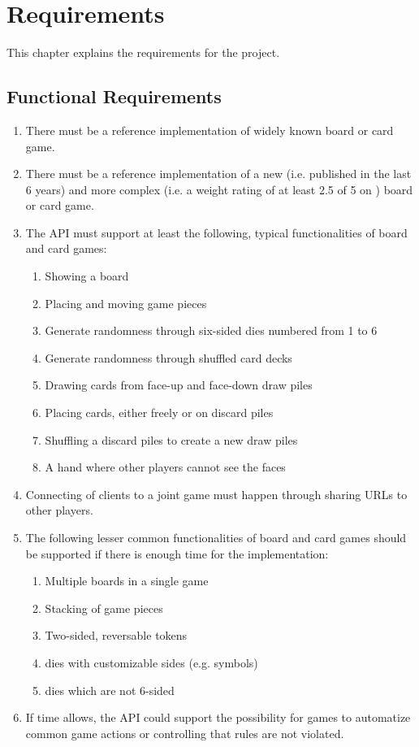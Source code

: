 \chapter{Requirements} \label{chap:requirements}

This chapter explains the requirements for the project.

\section{Functional Requirements}

\begin{enumerate}
  \item There must be a reference implementation of widely known board or card
  game.
  \item There must be a reference implementation of a new (i.e. published in
  the last 6 years) and more complex (i.e. a weight rating of at least 2.5 of 5
  on \cite{BGG}) board or card game.
  \item The API must support at least the following, typical functionalities of
  board and card games:
  \begin{enumerate}
    \item Showing a board
    \item Placing and moving game pieces
    \item Generate randomness through six-sided \glspl{die} numbered from 1 to 6
    \item Generate randomness through shuffled card \glspl{deck}
    \item Drawing cards from \gls{face}-up and \gls{face}-down
    \glspl{draw pile}
    \item Placing cards, either freely or on \glspl{discard pile}
    \item Shuffling a \glspl{discard pile} to create a new \glspl{draw pile}
    \item A \gls{hand} where other players cannot see the \glspl{face}
  \end{enumerate}
  \item Connecting of clients to a joint game must happen through sharing URLs
  to other players.
  \item The following lesser common functionalities of board and card games
  should be supported if there is enough time for the implementation:
  \begin{enumerate}
    \item Multiple boards in a single game
    \item Stacking of game pieces
    \item Two-sided, reversable tokens
    \item \Glspl{die} with customizable sides (e.g. symbols)
    \item \Glspl{die} which are not 6-sided
  \end{enumerate}
  \item If time allows, the API could support the possibility for games to
  automatize common game actions or controlling that rules are not violated.
\end{enumerate}

